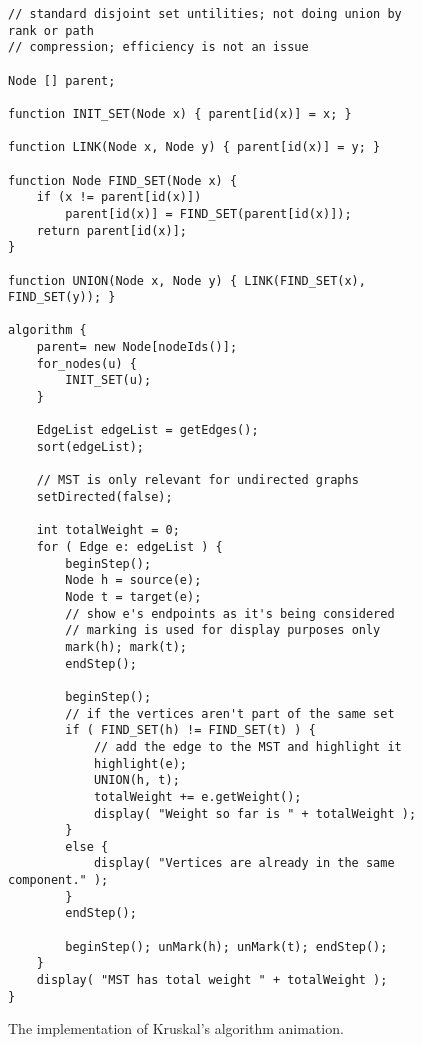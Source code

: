 \begin{figure}

{\small
\begin{verbatim}
// standard disjoint set untilities; not doing union by rank or path
// compression; efficiency is not an issue

Node [] parent;

function INIT_SET(Node x) { parent[id(x)] = x; }

function LINK(Node x, Node y) { parent[id(x)] = y; }

function Node FIND_SET(Node x) {
    if (x != parent[id(x)])
        parent[id(x)] = FIND_SET(parent[id(x)]);
    return parent[id(x)];
}

function UNION(Node x, Node y) { LINK(FIND_SET(x), FIND_SET(y)); }

algorithm {
    parent= new Node[nodeIds()];
    for_nodes(u) {
        INIT_SET(u);
    }

    EdgeList edgeList = getEdges();
    sort(edgeList);

    // MST is only relevant for undirected graphs
    setDirected(false);

    int totalWeight = 0;
    for ( Edge e: edgeList ) {
        beginStep();
        Node h = source(e);
        Node t = target(e);
        // show e's endpoints as it's being considered
        // marking is used for display purposes only
        mark(h); mark(t);
        endStep();

        beginStep();
        // if the vertices aren't part of the same set
        if ( FIND_SET(h) != FIND_SET(t) ) {
            // add the edge to the MST and highlight it
            highlight(e);
            UNION(h, t);
            totalWeight += e.getWeight();
            display( "Weight so far is " + totalWeight );
        }
        else {
            display( "Vertices are already in the same component." );
        }
        endStep();

        beginStep(); unMark(h); unMark(t); endStep();
    }
    display( "MST has total weight " + totalWeight );
}
\end{verbatim}
} %

\caption{The implementation of Kruskal's algorithm animation.}
\label{fig:kruskals_algorithm}
\end{figure}
